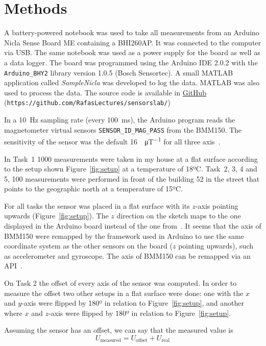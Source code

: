 \documentclass[DIV=14]{scrartcl}
\begin{document}
    \section{Methods}\label{sec:methods}
    A battery-powered notebook was used to take all measurements from an Arduino Nicla Sense Board ME containing a BHI260AP.
    It was connected to the computer via USB.
    The same notebook was used as a power supply for the board as well as a data logger.
    The board was programmed using the Arduino IDE 2.0.2 with the \texttt{Arduino\_BHY2} library version 1.0.5 (Bosch Sensortec).
    A small MATLAB application called \textit{SampleNicla} was developed to log the data.
    MATLAB was also used to process the data.
    The source code is available in \href{https://github.com/RafasLectures/sensorslab/blob/main/SampleNicla.mlapp}{GitHub}
    (\texttt{https://github.com/RafasLectures/sensorslab/})

    In a \SI{10}{\hertz} sampling rate (every \SI{100}{\milli\second}), the Arduino program reads the magnetometer
    virtual sensors \texttt{SENSOR\_ID\_MAG\_PASS} from the BMM150.
    The sensitivity of the sensor was the default \SI{16}{\LSB\per\micro\tesla} for all three axis~\cite{BMM150}.

    In Task~1 1000 measurements were taken in my house at a flat surface according to the setup shown Figure~\ref{fig:setup}
    at a temperature of 18ºC.
    Task~2, 3, 4 and 5, 100 measurements were performed in front of the building 52 in the street that
    points to the geographic north at a temperature of 15ºC.

    For all tasks the sensor was placed in a flat surface with its $z$-axis pointing upwards (Figure~\ref{fig:setup}).
    The $z$ direction on the sketch maps to the one displayed in the Arduino board instead of the one from~\cite{BMM150}.
    It seems that the axis of BMM150 were remapped by the framework used in Arduino to use the same coordinate system
    as the other sensors on the board ($z$ pointing upwards), such as accelerometer and gyroscope.
    The axis of BMM150 can be remapped via an API~\cite{BMM150}.

    On Task 2 the offset of every axis of the sensor was computed.
    In order to measure the offset two other setups in a flat surface were done:
    one with the $x$ and $y$-axis were flipped by 180º in relation to Figure~\ref{fig:setup}, and
    another where $x$ and $z$-axis were flipped by 180º in relation to Figure~\ref{fig:setup}.

    Assuming the sensor has an offset, we can say that the measured value is
    \begin{equation}
        U_{\mathrm{measured}} = U_{\mathrm{offset}} + U_{\mathrm{real}}
        \label{eq:measuredValue}
    \end{equation}
\end{document}
